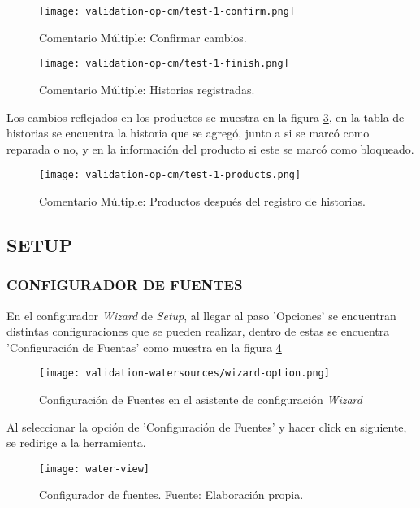 \begin{figure}[H]
	\centering
	\texttt{[image: validation-op-cm/test-1-confirm.png]}
	\caption{\label{fig:op-test-1-confirm-cm} Comentario Múltiple: Confirmar cambios.}
\end{figure}

\begin{figure}[H]
	\centering
	\texttt{[image: validation-op-cm/test-1-finish.png]}
	\caption{\label{fig:op-test-1-finish-cm} Comentario Múltiple: Historias registradas.}
\end{figure}

Los cambios reflejados en los productos se muestra en la figura \ref{fig:op-test-1-products-cm}, en la tabla de historias se encuentra la historia que se agregó, junto a si se marcó como reparada o no, y en la información del producto si este se marcó como bloqueado.

\begin{figure}[H]
	\centering
	\texttt{[image: validation-op-cm/test-1-products.png]}
	\caption{\label{fig:op-test-1-products-cm} Comentario Múltiple: Productos después del registro de historias.}
\end{figure}
\iffalse
\subsection{SETUP}

\subsubsection{CONFIGURADOR DE FUENTES}

En el configurador \textit{Wizard} de \textit{Setup}, al llegar al paso 'Opciones' se encuentran distintas configuraciones que se pueden realizar, dentro de estas se encuentra 'Configuración de Fuentas' como muestra en la figura \ref{fig:ws-wizard-option}

\begin{figure}[H]
	\centering
	\texttt{[image: validation-watersources/wizard-option.png]}
	\caption{\label{fig:ws-wizard-option} Configuración de Fuentes en el asistente de configuración \textit{Wizard}}
\end{figure}

Al seleccionar la opción de 'Configuración de Fuentes' y hacer click en siguiente, se redirige a la herramienta.

\begin{figure}[H]
	\centering
	\texttt{[image: water-view]}
	\caption{\label{fig:water-view} Configurador de fuentes. Fuente: Elaboración propia.}
\end{figure}

